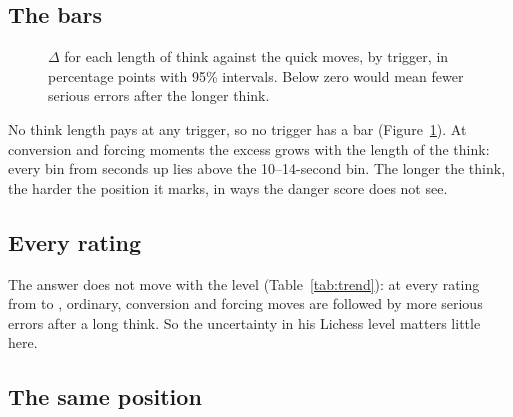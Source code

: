 \documentclass[11pt]{article}
\begin{document}
\subsection{The bars}

\begin{figure}[h]
\centering
\begin{subfigure}{0.49\textwidth}\centering\BookEndBarPlot\end{subfigure}\hfill
\begin{subfigure}{0.49\textwidth}\centering\ConversionBarPlot\end{subfigure}

\medskip
\begin{subfigure}{0.49\textwidth}\centering\ForcingBarPlot\end{subfigure}\hfill
\begin{subfigure}{0.49\textwidth}\centering\StructureBarPlot\end{subfigure}
\caption{$\Delta$ for each length of think against the quick moves, by trigger, in percentage
points with 95\% intervals. Below zero would mean fewer serious errors after the longer think.}
\label{fig:bars}
\end{figure}

No think length pays at any trigger, so no trigger has a bar (Figure~\ref{fig:bars}). At
conversion and forcing moments the excess grows with the length of the think: every bin from
\Deep{} seconds up lies above the 10--14-second bin. The longer the think, the harder the position
it marks, in ways the danger score does not see.

\subsection{Every rating}

\begin{table}[h]
\centering
\footnotesize\setlength{\tabcolsep}{2pt}\TrendTable
\caption{$\Delta$ by the mover's rating, in percentage points with 95\% intervals. Described,
not tested.}
\label{tab:trend}
\end{table}

The answer does not move with the level (Table~\ref{tab:trend}): at every rating from \RatingLo{} to \RatingHi,
ordinary, conversion and forcing moves are followed by more serious errors after a long think. So
the uncertainty in his Lichess level matters little here.

\subsection{The same position}
\end{document}
